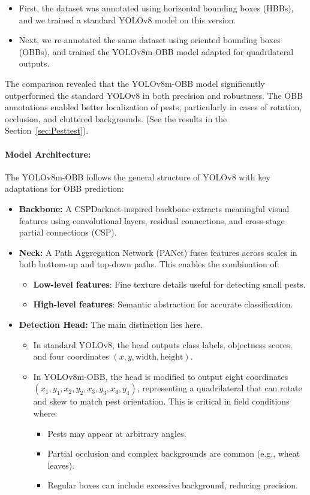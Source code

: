 \begin{itemize}
\item First, the dataset was annotated using horizontal bounding boxes (HBBs), and we trained a standard YOLOv8 model on this version.
\item Next, we re-annotated the same dataset using oriented bounding boxes (OBBs), and trained the YOLOv8m-OBB model adapted for quadrilateral outputs.
\end{itemize}

The comparison revealed that the YOLOv8m-OBB model significantly outperformed the standard YOLOv8 in both precision and robustness. The OBB annotations enabled better localization of pests, particularly in cases of rotation, occlusion, and cluttered backgrounds. (See the results in the Section~\ref{sec:Pesttest}).

\paragraph{Model Architecture:}

The YOLOv8m-OBB follows the general structure of YOLOv8 with key adaptations for OBB prediction:

\begin{itemize}
\item \textbf{Backbone:} A CSPDarknet-inspired backbone extracts meaningful visual features using convolutional layers, residual connections, and cross-stage partial connections (CSP).
\item \textbf{Neck:} A Path Aggregation Network (PANet) fuses features across scales in both bottom-up and top-down paths. This enables the combination of:
\begin{itemize}
    \item \textbf{Low-level features}: Fine texture details useful for detecting small pests.
    \item \textbf{High-level features}: Semantic abstraction for accurate classification.
\end{itemize}

\item \textbf{Detection Head:} The main distinction lies here. 
\begin{itemize}
    \item In standard YOLOv8, the head outputs class labels, objectness scores, and four coordinates \((x, y, \text{width}, \text{height})\).
    \item In YOLOv8m-OBB, the head is modified to output eight coordinates \((x_1, y_1, x_2, y_2, x_3, y_3, x_4, y_4)\), representing a quadrilateral that can rotate and skew to match pest orientation. This is critical in field conditions where:
    \begin{itemize}
        \item Pests may appear at arbitrary angles.
        \item Partial occlusion and complex backgrounds are common (e.g., wheat leaves).
        \item Regular boxes can include excessive background, reducing precision.
    \end{itemize}
\end{itemize}
\end{itemize}

